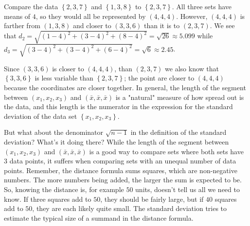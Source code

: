 \documentclass[10pt,]{book}
\theoremstyle{ptxdefinitionnotitle}
\theoremstyle{ptxdefinitiontitle}
\numberwithin{equation}{section}
\begin{document}
\par
\hypertarget{p-119}{}%
Compare the data \(\left\{ 2,3,7 \right\}\) and \(\left\{ 1, 3, 8 \right\}\) to \(\left\{ 2,3,7 \right\}\). All three sets have means of \(4\), so they would all be represented by \(\left( 4, 4, 4 \right)\). However, \(\left( 4, 4, 4 \right)\) is farther from \(\left( 1, 3, 8 \right)\) and closer to \(\left( 3, 3, 6 \right)\) than it is to \(\left( 2, 3, 7 \right)\). We see that \(d_2 = \sqrt{ (1-4)^2 + (3-4)^2 + (8-4)^2 } = \sqrt{26} \approx 5.099\) while \(d_3= \sqrt{ (3-4)^2 + (3-4)^2 + (6-4)^2 } = \sqrt{6} \approx 2.45\).%
\par
\hypertarget{p-120}{}%
Since \(\left( 3, 3, 6 \right)\) is closer to \(\left( 4, 4, 4 \right)\), than \(\left( 2, 3, 7 \right)\) we also know that \(\left\{ 3, 3, 6 \right\}\) is less variable than \(\left\{ 2, 3, 7 \right\}\); the point are closer to \(\left( 4, 4, 4 \right)\) because the coordinates are closer together. In general, the length of the segment between \(\left( x_1,x_2,x_3 \right)\) and \(\left( \bar{x}, \bar{x}, \bar{x} \right)\) is a "natural" measure of how spread out is the data, and this length is the numerator in the expression for the standard deviation of the data set \(\left\{ x_1,x_2,x_3 \right\}\).%
\par
\hypertarget{p-121}{}%
But what about the denominator \(\sqrt{n - 1}\) in the definition of the standard deviation? What's it doing there? While the length of the segment between \(\left( x_1,x_2,x_3 \right)\) and \(\left( \bar{x}, \bar{x}, \bar{x} \right)\) is a good way to compare sets where both sets have \(3\) data points, it suffers when comparing sets with an unequal number of data points. Remember, the distance formula sums squares, which are non-negative numbers. The more numbers being added, the larger the sum is expected to be. So, knowing the distance is, for example \(50\) units, doesn’t tell us all we need to know. If three squares add to \(50\), they should be fairly large, but if \(40\) squares add to \(50\), they are each likely quite small. The standard deviation tries to estimate the typical size of a summand in the distance formula.%
\par
\hypertarget{p-122}{}%
\end{document}
